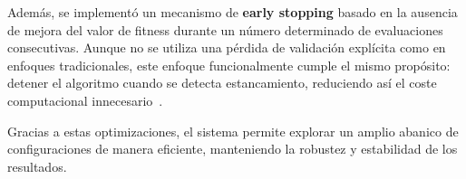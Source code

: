 Además, se implementó un mecanismo de \textbf{early stopping} basado en la ausencia de mejora del valor de fitness durante
un número determinado de evaluaciones consecutivas.
Aunque no se utiliza una pérdida de validación explícita como en enfoques tradicionales, este enfoque funcionalmente cumple el mismo propósito:
detener el algoritmo cuando se detecta estancamiento, reduciendo así el coste computacional innecesario~\cite{EarlyStoppingDiscussion2024}.


Gracias a estas optimizaciones, el sistema permite explorar un amplio abanico de configuraciones de manera eficiente, manteniendo la robustez y estabilidad de los resultados.